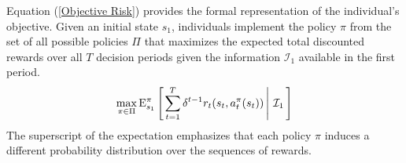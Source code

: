 \noindent Equation (\ref{Objective Risk}) provides the formal representation of the individual's objective. Given an initial state $s_1$, individuals implement the policy $\pi$ from the set of all possible policies $\Pi$ that maximizes the expected total discounted rewards over all $T$ decision periods given the information $\mathcal{I}_1$ available in the first period.
%
\begin{align}\label{Objective Risk}
\max_{\pi \in\Pi} \mathrm{E}_{s_1}^\pi\left[\left.\sum^{T}_{t = 1}  \delta^{t - 1} r_t(s_t, a^\pi_t(s_t))\,\right\vert\,\mathcal{I}_1\,\right]
\end{align}
%
The superscript of the expectation emphasizes that each policy $\pi$ induces a different probability distribution over the sequences of rewards.
